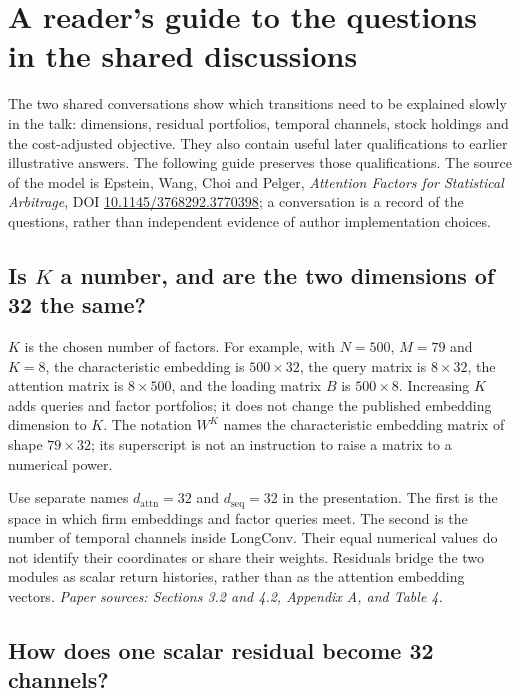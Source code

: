 \documentclass[11pt]{article}
\begin{document}
\section{A reader's guide to the questions in the shared discussions}
\label{sec:discussion-guide}

The two shared conversations show which transitions need to be explained
slowly in the talk: dimensions, residual portfolios, temporal channels,
stock holdings and the cost-adjusted objective. They also contain useful
later qualifications to earlier illustrative answers. The following
guide preserves those qualifications. The source of the model is
Epstein, Wang, Choi and Pelger, \emph{Attention Factors for Statistical
Arbitrage}, DOI \href{https://doi.org/10.1145/3768292.3770398}
{10.1145/3768292.3770398}; a conversation is a record of the questions,
rather than independent evidence of author implementation choices.

\subsection{Is \texorpdfstring{$K$}{K} a number, and are the two dimensions of 32 the same?}

$K$ is the chosen number of factors. For example, with $N=500$, $M=79$
and $K=8$, the characteristic embedding is $500\times32$, the query
matrix is $8\times32$, the attention matrix is $8\times500$, and the
loading matrix $B$ is $500\times8$. Increasing $K$ adds queries and factor
portfolios; it does not change the published embedding dimension to $K$.
The notation $W^K$ names the characteristic embedding matrix of shape
$79\times32$; its superscript is not an instruction to raise a matrix to
a numerical power.

Use separate names $d_{\mathrm{attn}}=32$ and $d_{\mathrm{seq}}=32$ in the
presentation. The first is the space in which firm embeddings and factor
queries meet. The second is the number of temporal channels inside
LongConv. Their equal numerical values do not identify their coordinates
or share their weights. Residuals bridge the two modules as scalar return
histories, rather than as the attention embedding vectors.
\emph{Paper sources: Sections 3.2 and 4.2, Appendix A, and Table 4.}

\subsection{How does one scalar residual become 32 channels?}
\end{document}

